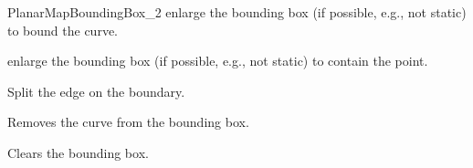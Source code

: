 \begin{ccRefConcept}{PlanarMapBoundingBox_2}
\ccModifiers
{}
{enlarge the bounding box (if possible, e.g., not static) to bound the curve.}

{enlarge the bounding box (if possible, e.g., not static) to contain the point.}

{Split the edge on the boundary.}


{Removes the curve from the bounding box.}

{Clears the bounding box.}

\ccHasModels
    \\

\end{ccRefConcept}

\renewcommand{\ccRefPageBegin}{}
\renewcommand{\ccRefPageEnd}{}

\ccRefPageEnd
